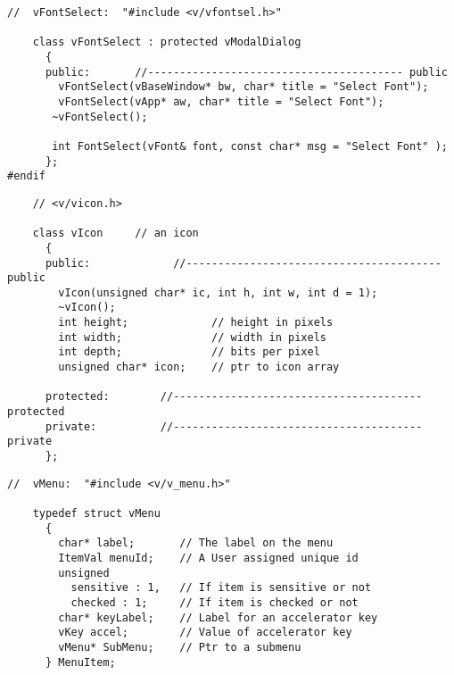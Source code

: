 
\footnotesize
\begin{verbatim}
//  vFontSelect:  "#include <v/vfontsel.h>"

    class vFontSelect : protected vModalDialog
      {
      public:       //---------------------------------------- public
        vFontSelect(vBaseWindow* bw, char* title = "Select Font");
        vFontSelect(vApp* aw, char* title = "Select Font");
       ~vFontSelect();

       int FontSelect(vFont& font, const char* msg = "Select Font" );
      };
#endif
\end{verbatim}
\normalfont\normalsize


\footnotesize
\begin{verbatim}
    // <v/vicon.h>

    class vIcon     // an icon
      {
      public:             //---------------------------------------- public
        vIcon(unsigned char* ic, int h, int w, int d = 1);
        ~vIcon();
        int height;             // height in pixels
        int width;              // width in pixels
        int depth;              // bits per pixel
        unsigned char* icon;    // ptr to icon array

      protected:        //--------------------------------------- protected
      private:          //--------------------------------------- private
      };
\end{verbatim}
\normalfont\normalsize


\footnotesize
\begin{verbatim}
//  vMenu:  "#include <v/v_menu.h>"

    typedef struct vMenu
      {
        char* label;       // The label on the menu
        ItemVal menuId;    // A User assigned unique id
        unsigned
          sensitive : 1,   // If item is sensitive or not
          checked : 1;     // If item is checked or not
        char* keyLabel;    // Label for an accelerator key
        vKey accel;        // Value of accelerator key
        vMenu* SubMenu;    // Ptr to a submenu 
      } MenuItem;
\end{verbatim}
\normalfont\normalsize

